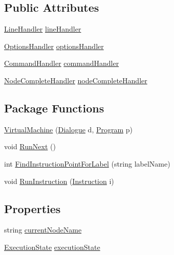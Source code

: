 \subsection*{Public Attributes}
\begin{DoxyCompactItemize}
\item 
\hyperlink{a00072_aac9ec1011ea2c01460044d7c8355f398}{Line\-Handler} \hyperlink{a00072_a29b30454f068fc7e107d48bff4346fd9}{line\-Handler}
\item 
\hyperlink{a00072_a78dfd54b743e53078eed19ab7be2b6cf}{Options\-Handler} \hyperlink{a00072_acd25fe2e3aa90dc87ba25d9af904465b}{options\-Handler}
\item 
\hyperlink{a00072_a1b57359378059b134ba76acddafd8d81}{Command\-Handler} \hyperlink{a00072_ab89b02227b92c74552f719afd47848e4}{command\-Handler}
\item 
\hyperlink{a00072_a5bf3aa51578847c18191fec665a840f9}{Node\-Complete\-Handler} \hyperlink{a00072_a5129c63e67e2d4e2780d86b8351320a2}{node\-Complete\-Handler}
\end{DoxyCompactItemize}
\subsection*{Package Functions}
\begin{DoxyCompactItemize}
\item 
\hyperlink{a00072_aefa64c4353e5c261f1189649638e49a6}{Virtual\-Machine} (\hyperlink{a00036}{Dialogue} d, \hyperlink{a00067}{Program} p)
\item 
void \hyperlink{a00072_af3cc0337914b9f66454a3d52208dba5f}{Run\-Next} ()
\item 
int \hyperlink{a00072_af613c8b2d098678b6ea05b509c0a0cb6}{Find\-Instruction\-Point\-For\-Label} (string label\-Name)
\item 
void \hyperlink{a00072_ad2caf9ca4f00cdcbd58983be7c106971}{Run\-Instruction} (\hyperlink{a00044}{Instruction} i)
\end{DoxyCompactItemize}
\subsection*{Properties}
\begin{DoxyCompactItemize}
\item 
string \hyperlink{a00072_ab3afe8360a344c16c21213edb3641481}{current\-Node\-Name}
\item 
\hyperlink{a00072_add28fa9c8a45ca579e84d05920bbc42d}{Execution\-State} \hyperlink{a00072_a66491da06023dabfb63d09e6ccbba74f}{execution\-State}
\end{DoxyCompactItemize}
